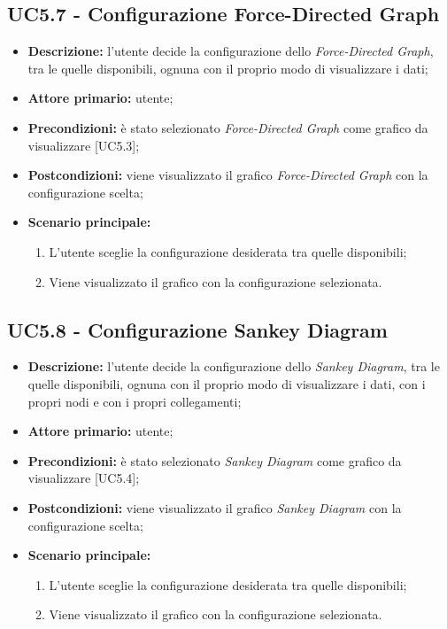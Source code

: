 \subsection{UC5.7 - Configurazione Force-Directed Graph}
\begin{itemize}
    \item \textbf{Descrizione:} l'utente decide la configurazione dello \textit{Force-Directed Graph}, tra le quelle disponibili, ognuna con il proprio modo di visualizzare i dati;
    \item \textbf{Attore primario:} utente;
    \item \textbf{Precondizioni:} è stato selezionato \textit{Force-Directed Graph} come grafico da visualizzare [UC5.3];
    \item \textbf{Postcondizioni:} viene visualizzato il grafico \textit{Force-Directed Graph} con la configurazione scelta;
    \item \textbf{Scenario principale:}
    \begin{enumerate}
      \item L'utente sceglie la configurazione desiderata tra quelle disponibili;
      \item Viene visualizzato il grafico con la configurazione selezionata.
    \end{enumerate}
\end{itemize}

\subsection{UC5.8 - Configurazione Sankey Diagram}
\begin{itemize}
    \item \textbf{Descrizione:} l'utente decide la configurazione dello \textit{Sankey Diagram}, tra le quelle disponibili, ognuna con il proprio modo di visualizzare i dati, con i propri nodi e con i propri collegamenti;
    \item \textbf{Attore primario:} utente;
    \item \textbf{Precondizioni:} è stato selezionato \textit{Sankey Diagram} come grafico da visualizzare [UC5.4];
    \item \textbf{Postcondizioni:} viene visualizzato il grafico \textit{Sankey Diagram} con la configurazione scelta;
    \item \textbf{Scenario principale:}
    \begin{enumerate}
      \item L'utente sceglie la configurazione desiderata tra quelle disponibili;
      \item Viene visualizzato il grafico con la configurazione selezionata.
    \end{enumerate}
\end{itemize}

